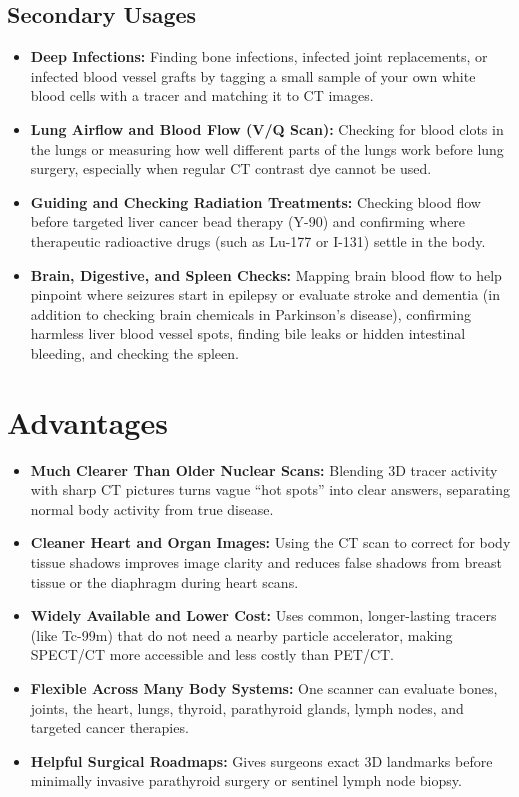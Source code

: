 \subsection{Secondary Usages}
\begin{itemize}
    \item \textbf{Deep Infections:} Finding bone infections, infected joint replacements, or infected blood vessel grafts by tagging a small sample of your own white blood cells with a tracer and matching it to CT images.
    \item \textbf{Lung Airflow and Blood Flow (V/Q Scan):} Checking for blood clots in the lungs or measuring how well different parts of the lungs work before lung surgery, especially when regular CT contrast dye cannot be used.
    \item \textbf{Guiding and Checking Radiation Treatments:} Checking blood flow before targeted liver cancer bead therapy (Y-90) and confirming where therapeutic radioactive drugs (such as Lu-177 or I-131) settle in the body.
    \item \textbf{Brain, Digestive, and Spleen Checks:} Mapping brain blood flow to help pinpoint where seizures start in epilepsy or evaluate stroke and dementia (in addition to checking brain chemicals in Parkinson's disease), confirming harmless liver blood vessel spots, finding bile leaks or hidden intestinal bleeding, and checking the spleen.
\end{itemize}

\section{Advantages}
\begin{itemize}
    \item \textbf{Much Clearer Than Older Nuclear Scans:} Blending 3D tracer activity with sharp CT pictures turns vague ``hot spots'' into clear answers, separating normal body activity from true disease.
    \item \textbf{Cleaner Heart and Organ Images:} Using the CT scan to correct for body tissue shadows improves image clarity and reduces false shadows from breast tissue or the diaphragm during heart scans.
    \item \textbf{Widely Available and Lower Cost:} Uses common, longer-lasting tracers (like Tc-99m) that do not need a nearby particle accelerator, making SPECT/CT more accessible and less costly than PET/CT.
    \item \textbf{Flexible Across Many Body Systems:} One scanner can evaluate bones, joints, the heart, lungs, thyroid, parathyroid glands, lymph nodes, and targeted cancer therapies.
    \item \textbf{Helpful Surgical Roadmaps:} Gives surgeons exact 3D landmarks before minimally invasive parathyroid surgery or sentinel lymph node biopsy.
\end{itemize}

